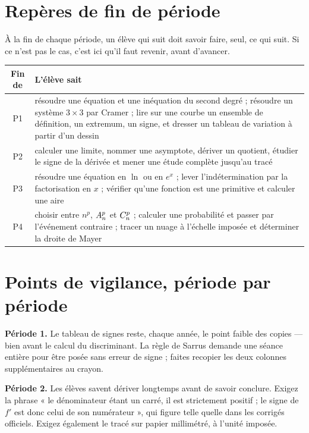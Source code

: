 \section{Repères de fin de période}

À la fin de chaque période, un élève qui suit doit savoir faire, seul, ce qui
suit. Si ce n'est pas le cas, c'est ici qu'il faut revenir, avant d'avancer.

\begin{center}\footnotesize
\renewcommand{\arraystretch}{1.4}
\begin{tabular}{|c|L{10.4cm}|}
\hline
\textbf{Fin de} & \textbf{L'élève sait}\\
\hline
P1 & résoudre une équation et une inéquation du second degré ; résoudre un
     système $3\times3$ par Cramer ; lire sur une courbe un ensemble de
     définition, un extremum, un signe, et dresser un tableau de variation à
     partir d'un dessin\\
P2 & calculer une limite, nommer une asymptote, dériver un quotient,
     étudier le signe de la dérivée et mener une étude complète jusqu'au
     tracé\\
P3 & résoudre une équation en $\ln$ ou en $e^{x}$ ; lever l'indétermination
     par la factorisation en $x$ ; vérifier qu'une fonction est une
     primitive et calculer une aire\\
P4 & choisir entre $n^{p}$, $\arrang{p}{n}$ et $\combi{p}{n}$ ; calculer une
     probabilité et passer par l'événement contraire ; tracer un nuage à
     l'échelle imposée et déterminer la droite de Mayer\\
\hline
\end{tabular}
\end{center}

\section{Points de vigilance, période par période}

\textbf{Période 1.} Le tableau de signes reste, chaque année, le point
faible des copies — bien avant le calcul du discriminant. La règle de Sarrus
demande une séance entière pour être posée sans erreur de signe ; faites
recopier les deux colonnes supplémentaires au crayon.

\textbf{Période 2.} Les élèves savent dériver longtemps avant de savoir
conclure. Exigez la phrase « le dénominateur étant un carré, il est
strictement positif ; le signe de $f'$ est donc celui de son numérateur »,
qui figure telle quelle dans les corrigés officiels. Exigez également le
tracé sur papier millimétré, à l'unité imposée.


